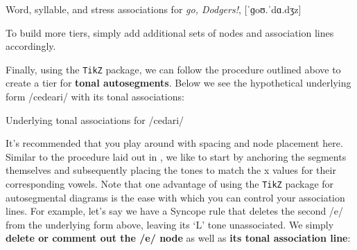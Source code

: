 \documentclass[output=paper,colorlinks,citecolor=brown,
]{langscibook}
\begin{document}
\ea Word, syllable, and stress associations for \textit{go, Dodgers!}, [ˈɡoʊ.ˈdɑ.dʒ\textrhookschwa z]

\z

\noindent To build more tiers, simply add additional sets of nodes and association lines accordingly.

Finally, using the \texttt{TikZ} package, we can follow the procedure outlined above to create a tier for \textbf{tonal autosegments}. Below we see the hypothetical underlying form /cedeari/ with its tonal associations:

\ea Underlying tonal associations for /cedari/

\z

\noindent It's recommended that you play around with spacing and node placement here. Similar to the procedure laid out in , we like to start by anchoring the segments themselves and subsequently placing the tones to match the x values for their corresponding vowels. Note that one advantage of using the \texttt{TikZ} package for autosegmental diagrams is the ease with which you can control your association lines. For example, let's say we have a Syncope rule that deletes the second /e/ from the underlying form above, leaving its `L' tone unassociated. We simply \textbf{delete or comment out the /e/ node} as well as \textbf{its tonal association line}:
\end{document}
